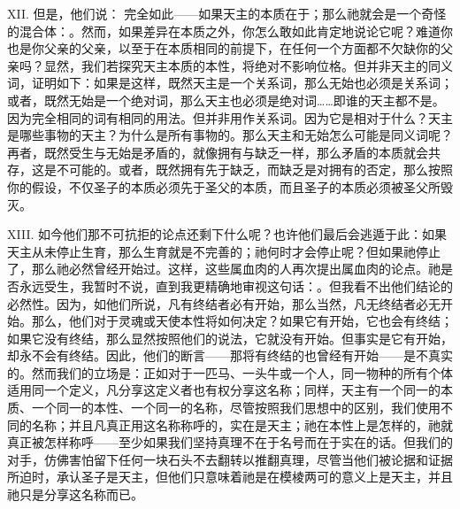 XII. 但是，他们说： 完全如此——如果天主的本质在于；那么祂就会是一个奇怪的混合体：。然而，如果差异在本质之外，你怎么敢如此肯定地说论它呢？难道你也是你父亲的父亲，以至于在本质相同的前提下，在任何一个方面都不欠缺你的父亲吗？显然，我们若探究天主本质的本性，将绝对不影响位格。但并非天主的同义词，证明如下：如果是这样，既然天主是一个关系词，那么无始也必须是关系词；或者，既然无始是一个绝对词，那么天主也必须是绝对词……即谁的天主都不是。因为完全相同的词有相同的用法。但并非用作关系词。因为它是相对于什么？天主是哪些事物的天主？为什么是所有事物的。那么天主和无始怎么可能是同义词呢？再者，既然受生与无始是矛盾的，就像拥有与缺乏一样，那么矛盾的本质就会共存，这是不可能的。或者，既然拥有先于缺乏，而缺乏是对拥有的否定，那么按照你的假设，不仅圣子的本质必须先于圣父的本质，而且圣子的本质必须被圣父所毁灭。\par

XIII. 如今他们那不可抗拒的论点还剩下什么呢？也许他们最后会逃遁于此：如果天主从未停止生育，那么生育就是不完善的；祂何时才会停止呢？但如果祂停止了，那么祂必然曾经开始过。这样，这些属血肉的人再次提出属血肉的论点。祂是否永远受生，我暂时不说，直到我更精确地审视这句话：。但我看不出他们结论的必然性。因为，如他们所说，凡有终结者必有开始，那么当然，凡无终结者必无开始。那么，他们对于灵魂或天使本性将如何决定？如果它有开始，它也会有终结；如果它没有终结，那么显然按照他们的说法，它就没有开始。但事实是它有开始，却永不会有终结。因此，他们的断言——那将有终结的也曾经有开始——是不真实的。然而我们的立场是：正如对于一匹马、一头牛或一个人，同一物种的所有个体适用同一个定义，凡分享这定义者也有权分享这名称；同样，天主有一个同一的本质、一个同一的本性、一个同一的名称，尽管按照我们思想中的区别，我们使用不同的名称；并且凡真正用这名称称呼的，实在是天主；祂在本性上是怎样的，祂就真正被怎样称呼——至少如果我们坚持真理不在于名号而在于实在的话。但我们的对手，仿佛害怕留下任何一块石头不去翻转以推翻真理，尽管当他们被论据和证据所迫时，承认圣子是天主，但他们只意味着祂是在模棱两可的意义上是天主，并且祂只是分享这名称而已。\par

